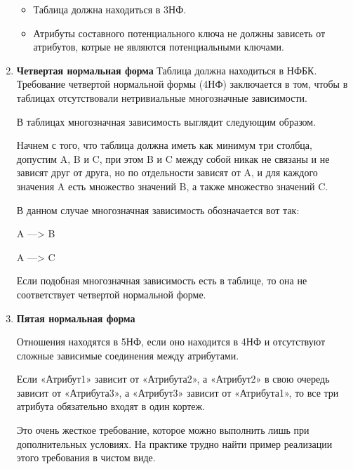 \begin{enumerate}
    \begin{itemize}
	    \item Таблица должна находиться в 3НФ. 
	    \item Атрибуты составного потенциального ключа не должны зависеть от атрибутов, котрые не являются потенциальными ключами.
    \end{itemize}


    \item \textbf{Четвертая нормальная форма}
    Таблица должна находиться в НФБК.
    Требование четвертой нормальной формы (4НФ) заключается в том, чтобы в таблицах отсутствовали нетривиальные многозначные зависимости.

    В таблицах многозначная зависимость выглядит следующим образом.

    Начнем с того, что таблица должна иметь как минимум три столбца, допустим A, B и C, при этом B и C между собой никак не связаны и не зависят друг от друга, но по отдельности зависят от A, и для каждого значения A есть множество значений B, а также множество значений C.

    В данном случае многозначная зависимость обозначается вот так:

    A —> B

    A —> C

    Если подобная многозначная зависимость есть в таблице, то она не соответствует четвертой нормальной форме.

\item  \textbf{Пятая нормальная форма}

    Отношения находятся в 5НФ, если оно находится в 4НФ и отсутствуют сложные зависимые соединения между атрибутами.

    Если «Атрибут1» зависит от «Атрибута2», а «Атрибут2» в свою очередь зависит от «Атрибута3», а «Атрибут3» зависит от «Атрибута1», то все три атрибута обязательно входят в один кортеж.

    Это очень жесткое требование, которое можно выполнить лишь при дополнительных условиях. На практике трудно найти пример реализации этого требования в чистом виде.


\end{enumerate}
